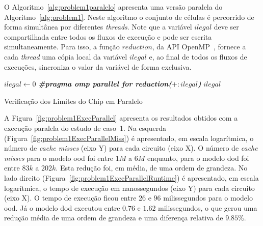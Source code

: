 
O Algoritmo~\ref{alg:problem1paralelo} apresenta uma versão paralela do Algoritmo~\ref{alg:problem1}.
Neste algoritmo o conjunto de células é percorrido de forma simultânea por diferentes \textit{threads}.
Note que a variável $ilegal$ deve ser compartilhada entre todos os fluxos de execução e pode ser escrita simultaneamente.
Para isso, a função $reduction$, da API OpenMP~\cite{openmp}, fornece a cada \textit{thread} uma cópia local da variável $ilegal$ e, ao final de todos os fluxos de execuções, sincroniza o valor da variável de forma exclusiva.


\begin{algorithm}[h!t]
	\LinesNumbered
    $ilegal \gets 0$\; \label{alg:problem1paralelo:var:initIlegal}
  	\textit{\textbf{\#pragma omp parallel for reduction(}}$+:ilegal$\textit{\textbf{)}} \hspace{20pt}  \label{alg:problem1paralelo:var:endFor}
  	\Return $ilegal$\; \label{alg:problem1paralelo:var:retorno}
	\caption{Verificação dos Limites do Chip em Paralelo} 
	\label{alg:problem1paralelo}
\end{algorithm}

A Figura~\ref{fig:problem1ExecParallel} apresenta os resultados obtidos com a execução paralela do estudo de caso~1.
Na esquerda (Figura~\ref{fig:problem1ExecParallelMiss}) é apresentado, em escala logarítmica, o número de  \textit{cache misses} (eixo Y) para cada circuito (eixo X).
O número de  \textit{cache misses} para o modelo \ac{ood} foi entre $1M$ a $6M$ enquanto, para o modelo \ac{dod} foi entre $83k$ a $202k$.
Esta redução foi, em média, de uma ordem de grandeza.
No lado direito (Figura~\ref{fig:problem1ExecParallelRuntime}) é apresentado, em escala logarítmica, o tempo de execução em nanossegundos (eixo Y) para cada circuito (eixo X).
O tempo de execução ficou entre $26$ e $96$ milissegundos para o modelo \ac{ood}. Já o modelo \ac{dod} executou entre $0.76$ e $1.62$ milissegundos, o que gerou uma redução média de uma ordem de grandeza e uma diferença relativa de $9.85\%$.

